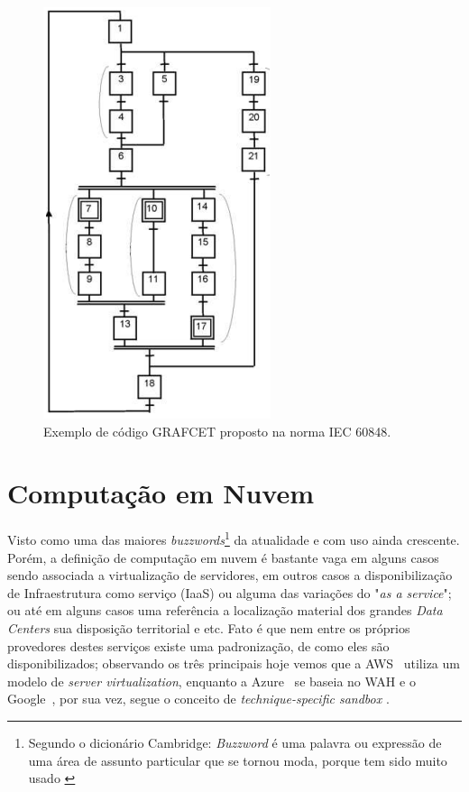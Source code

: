\begin{figure}[htb]
    \begin{center}
	    \includegraphics[scale=0.5]{figs/grafcet-diag.png}
	\end{center}
	\caption{\label{fig:grafcet} Exemplo de código GRAFCET proposto na norma IEC 60848.} 
\end{figure}

\section{Computação em Nuvem}

Visto como uma das maiores \textit{buzzwords}\footnote{Segundo o dicionário Cambridge: \textit{Buzzword} é uma palavra ou expressão de uma 
área de assunto particular que se tornou moda, porque tem sido muito usado \cite{buzzword-cam}} da atualidade e com uso 
ainda crescente. Porém, a definição de computação em nuvem é bastante vaga \cite{artigo-nuvem} em alguns casos sendo 
associada a virtualização de servidores, em outros casos a disponibilização de Infraestrutura como serviço (\ac{IaaS}) ou 
alguma das variações do "\textit{as a service}"; ou até em alguns casos uma referência a localização material dos grandes
\textit{Data Centers} sua disposição territorial e etc. Fato é que nem entre os próprios provedores destes serviços 
existe uma padronização, de como eles são disponibilizados; observando os três principais hoje vemos que a AWS\textregistered~
utiliza um modelo de \textit{server virtualization}, enquanto a Azure\textregistered~ se baseia no \ac{WAH} e o Google\textregistered~, por sua vez, segue o 
conceito de \textit{technique-specific sandbox} \cite{artigo-nuvem}.

